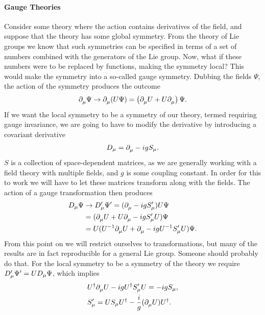 \paragraph{Gauge Theories}
Consider some theory where the action contains derivatives of the field, and suppose that the theory has some global symmetry. From the theory of Lie groups we know that such symmetries can be specified in terms of a set of numbers combined with the generators of the Lie group. Now, what if these numbers were to be replaced by functions, making the symmetry local? This would make the symmetry into a so-called gauge symmetry. Dubbing the fields $\Psi$, the action of the symmetry produces the outcome
\begin{align*}
	\partial^{}_{\mu}\Psi\to \partial^{}_{\mu}(U\Psi) = \left(\partial^{}_{\mu}U + U\partial^{}_{\mu}\right)\Psi.
\end{align*}
If we want the local symmetry to be a symmetry of our theory, termed requiring gauge invariance, we are going to have to modify the derivative by introducing a covariant derivative
\begin{align*}
	D_{\mu} = \partial^{}_{\mu} - igS_{\mu}.
\end{align*}
$S$ is a collection of space-dependent matrices, as we are generally working with a field theory with multiple fields, and $g$ is some coupling constant. In order for this to work we will have to let these matrices transform along with the fields. The action of a gauge transformation then produces
\begin{align*}
	D_{\mu}\Psi &\to D_{\mu}^{\prime}\Psi^{\prime} = (\partial^{}_{\mu} - igS_{\mu}^{\prime})U\Psi \\
	            &= (\partial^{}_{\mu}U + U\partial^{}_{\mu} - igS_{\mu}^{\prime} U)\Psi \\
	            &= U(U^{-1}\partial^{}_{\mu}U + \partial^{}_{\mu} - igU^{-1}S_{\mu}^{\prime} U)\Psi.
\end{align*}
From this point on we will restrict ourselves to  transformations, but many of the results are in fact reproducible for a general Lie group. Someone should probably do that. For the local symmetry to be a symmetry of the theory we require $D_{\mu}^{\prime}\Psi^{\prime} = UD_{\mu}\Psi$, which implies
\begin{align*}
	&U^{\dagger}\partial^{}_{\mu}U - igU^{\dagger} S_{\mu}^{\prime} U = -igS_{\mu}, \\
	&S_{\mu}^{\prime} = US_{\mu}U^{\dagger} - \frac{i}{g}(\partial^{}_{\mu}U)U^{\dagger}.
\end{align*}

